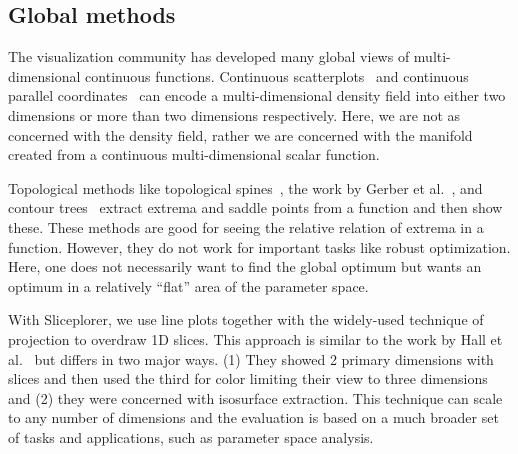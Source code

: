 \subsection{Global methods}

The visualization community has developed many global views of
multi-dimensional continuous functions. Continuous
scatterplots~\cite{Bachthaler:2008} and continuous parallel
coordinates~\cite{Heinrich:2009} can encode a multi-dimensional density field
into either two dimensions or more than two dimensions respectively.  Here, we
are not as concerned with the density field, rather we are concerned with the
manifold created from a continuous multi-dimensional scalar function. 

Topological methods like topological
spines~\cite{Correa:2011}, the work by Gerber et al.~\cite{Gerber:2010}, and
contour trees~\cite{Carr:2003a} extract extrema and saddle points from a
function and then show these. These methods are good for seeing the relative
relation of extrema in a function. However, they do not work for important
tasks like robust optimization. Here, one does not necessarily want to find the
global optimum but wants an optimum in a relatively ``flat'' area of the
parameter space. 

With Sliceplorer, we use line plots
together with the widely-used technique of projection to overdraw 1D slices. This approach is similar to the work by Hall et al.~\cite{Hall:2014} but differs in two major ways. (1) They showed 2 primary dimensions with slices and then used the third for color limiting their view to three dimensions and (2) they were concerned with isosurface extraction. This technique can scale to any number of dimensions and the evaluation is based on a much broader set of tasks and applications, such as parameter space analysis. 

